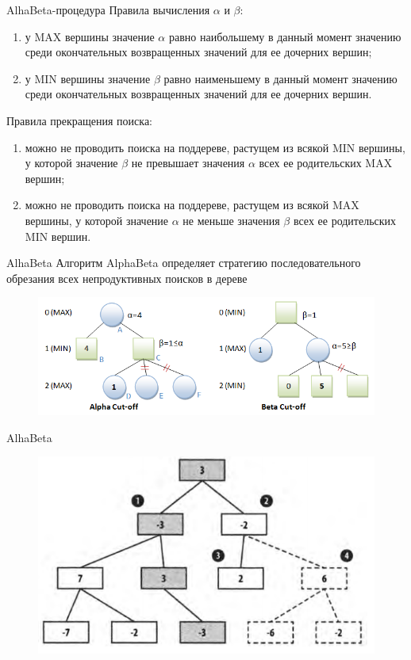 \documentclass{beamer}
\begin{document}
\begin{frame}{AlhaBeta-процедура}
Правила вычисления $\alpha$ и $\beta$:
\begin{enumerate}
\item у MAX вершины значение $\alpha$ равно наибольшему в данный момент значению среди окончательных возвращенных значений для ее дочерних вершин;
\item у MIN вершины значение $\beta$ равно наименьшему в данный момент значению среди окончательных возвращенных значений для ее дочерних вершин.
\end{enumerate}
Правила прекращения поиска:
\begin{enumerate}
\item можно не проводить поиска на поддереве, растущем из всякой MIN вершины, у которой значение $\beta$ не превышает значения $\alpha$ всех ее родительских MAX вершин;
\item можно не проводить поиска на поддереве, растущем из всякой MAX вершины, у которой значение $\alpha$ не меньше значения $\beta$ всех ее родительских MIN вершин.
\end{enumerate}
\end{frame}

\begin{frame}{AlhaBeta}
Алгоритм AlphaBeta определяет стратегию последовательного обрезания всех непродуктивных поисков в дереве
\begin{figure}[h]
\centering
\includegraphics[scale=0.6]{images/lec05-pic15.png}
\end{figure}
\end{frame}

\begin{frame}{AlhaBeta}
\begin{figure}[h]
\centering
\includegraphics[scale=0.6]{images/lec05-pic08.png}
\end{figure}
\end{frame}
\end{document}
